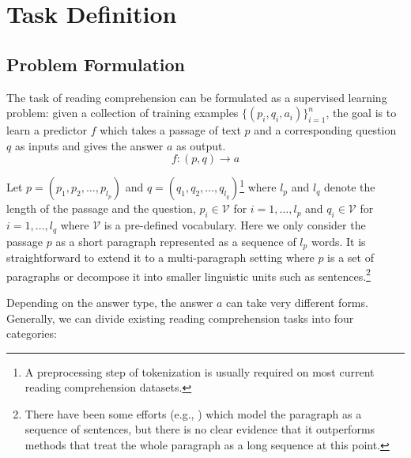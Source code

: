 
\section{Task Definition}
\label{sec:task-definition}

\subsection{Problem Formulation}

The task of reading comprehension can be formulated as a supervised learning problem: given a collection of training examples $\{({p}_i, {q}_i, {a}_i)\}_{i=1}^{n}$, the goal is to learn a predictor $f$ which takes a passage of text ${p}$ and a corresponding question ${q}$ as inputs and gives the answer ${a}$ as output.
\begin{equation}
  f: ({p}, {q}) \longrightarrow {a}
\end{equation}

Let ${p} = (p_1, p_2, \ldots, p_{l_p})$ and ${q} = (q_1, q_2, \ldots, q_{l_q})$\footnote{A preprocessing step of tokenization is usually required on most current reading comprehension datasets.} where $l_p$ and $l_q$ denote the length of the passage and the question, $p_i \in \mathcal{V}$ for $i = 1, \ldots, l_p$ and $q_i \in \mathcal{V}$ for $i = 1, \ldots, l_q$ where $\mathcal{V}$ is a pre-defined vocabulary. Here we only consider the passage ${p}$ as a short paragraph represented as a sequence of $l_p$ words. It is straightforward to extend it to a multi-paragraph setting \cite{clark2018simple} where ${p}$ is a set of paragraphs or decompose it into smaller linguistic units such as sentences.\footnote{There have been some efforts (e.g., \cite{xie2017constituent}) which model the paragraph as a sequence of sentences, but there is no clear evidence that it outperforms methods that treat the whole paragraph as a long sequence at this point.}

Depending on the answer type, the answer ${a}$ can take very different forms. Generally, we can divide existing reading comprehension tasks into four categories:

